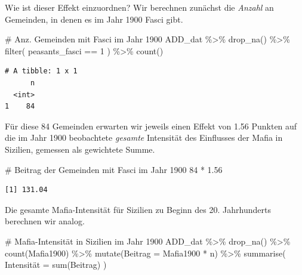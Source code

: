 \documentclass[
  a4paper,
  DIV=11,
  oneside]{scrreprt}
\newenvironment{Shaded}{\begin{snugshade}}{\end{snugshade}}
\newcommand{\AttributeTok}[1]{\textcolor[rgb]{0.40,0.45,0.13}{#1}}
\newcommand{\CommentTok}[1]{\textcolor[rgb]{0.37,0.37,0.37}{#1}}
\newcommand{\DecValTok}[1]{\textcolor[rgb]{0.68,0.00,0.00}{#1}}
\newcommand{\FloatTok}[1]{\textcolor[rgb]{0.68,0.00,0.00}{#1}}
\newcommand{\FunctionTok}[1]{\textcolor[rgb]{0.28,0.35,0.67}{#1}}
\newcommand{\NormalTok}[1]{\textcolor[rgb]{0.00,0.23,0.31}{#1}}
\newcommand{\OtherTok}[1]{\textcolor[rgb]{0.00,0.23,0.31}{#1}}
\newcommand{\SpecialCharTok}[1]{\textcolor[rgb]{0.37,0.37,0.37}{#1}}
\begin{document}
Wie ist dieser Effekt einzuordnen? Wir berechnen zunächst die
\emph{Anzahl} an Gemeinden, in denen es im Jahr 1900 Fasci gibt.

\begin{Shaded}
\begin{Highlighting}[]
\CommentTok{\# Anz. Gemeinden mit Fasci im Jahr 1900}
\NormalTok{ADD\_dat }\SpecialCharTok{\%\textgreater{}\%} 
  \FunctionTok{drop\_na}\NormalTok{() }\SpecialCharTok{\%\textgreater{}\%} 
  \FunctionTok{filter}\NormalTok{(}
\NormalTok{    peasants\_fasci }\SpecialCharTok{==} \DecValTok{1}
\NormalTok{  ) }\SpecialCharTok{\%\textgreater{}\%} 
  \FunctionTok{count}\NormalTok{()}
\end{Highlighting}
\end{Shaded}

\begin{verbatim}
# A tibble: 1 x 1
      n
  <int>
1    84
\end{verbatim}

Für diese 84 Gemeinden erwarten wir jeweils einen Effekt von 1.56
Punkten auf die im Jahr 1900 beobachtete \emph{gesamte} Intensität des
Einflusses der Mafia in Sizilien, gemessen als gewichtete Summe.

\begin{Shaded}
\begin{Highlighting}[]
\CommentTok{\# Beitrag der Gemeinden mit Fasci im Jahr 1900}
\DecValTok{84} \SpecialCharTok{*} \FloatTok{1.56}
\end{Highlighting}
\end{Shaded}

\begin{verbatim}
[1] 131.04
\end{verbatim}

Die gesamte Mafia-Intensität für Sizilien zu Beginn des 20. Jahrhunderts
berechnen wir analog.

\begin{Shaded}
\begin{Highlighting}[]
\CommentTok{\# Mafia{-}Intensität in Sizilien im Jahr 1900}
\NormalTok{ADD\_dat }\SpecialCharTok{\%\textgreater{}\%} 
  \FunctionTok{drop\_na}\NormalTok{() }\SpecialCharTok{\%\textgreater{}\%} 
  \FunctionTok{count}\NormalTok{(Mafia1900) }\SpecialCharTok{\%\textgreater{}\%} 
  \FunctionTok{mutate}\NormalTok{(}\AttributeTok{Beitrag =}\NormalTok{ Mafia1900 }\SpecialCharTok{*}\NormalTok{ n) }\SpecialCharTok{\%\textgreater{}\%}
  \FunctionTok{summarise}\NormalTok{(}
\NormalTok{     Intensität }\OtherTok{=} \FunctionTok{sum}\NormalTok{(Beitrag)}
\NormalTok{  )}
\end{Highlighting}
\end{Shaded}
\end{document}
